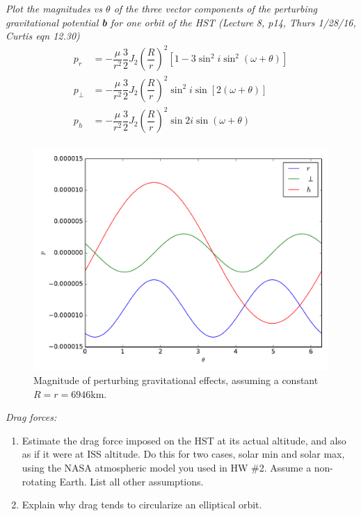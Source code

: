 \documentclass[onecolumn,10pt]{jhwhw}
\begin{document}
\clearpage
\problem{}
\textit{Plot the magnitudes vs $\theta$ of the three vector components of the perturbing gravitational potential \textbf{b} for one orbit of the HST (Lecture 8, p14, Thurs 1/28/16, Curtis eqn 12.30)}
\begin{align*}
p_r &= - \dfrac{\mu}{r^2} \dfrac{3}{2} J_2 \left( \dfrac{R}{r} \right)^2 \left[ 1 - 3 \sin^2 i \sin^2 (\omega + \theta) \right] \\
p_{\bot} &= - \dfrac{\mu}{r^2} \dfrac{3}{2} J_2 \left( \dfrac{R}{r} \right)^2 \sin^2 i \sin [2(\omega + \theta)] \\
p_h &= - \dfrac{\mu}{r^2} \dfrac{3}{2} J_2 \left( \dfrac{R}{r} \right)^2 \sin 2i \sin (\omega + \theta) \\
\end{align*}
\begin{figure}[tbh!]
\begin{center}
\includegraphics[height=0.55\textheight]{p4.pdf}
\end{center}
\caption{Magnitude of perturbing gravitational effects, assuming a constant $R=r=6946$km.}
\end{figure}


\clearpage
\problem{}
\textit{Drag forces:}
\begin{enumerate}
\item Estimate the drag force imposed on the HST at its actual altitude, and also as if it were at ISS altitude. Do this for two cases, solar min and solar max, using the NASA atmospheric model you used in HW \#2. Assume a non-rotating Earth. List all other assumptions.
\item Explain why drag tends to circularize an elliptical orbit.
\end{enumerate}
\end{document}
